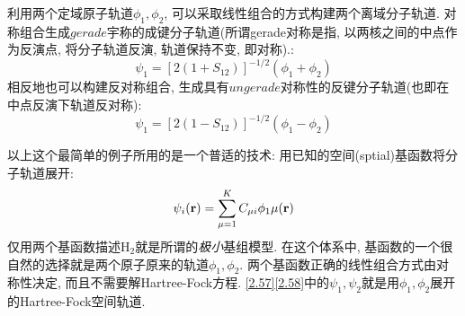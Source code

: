 利用两个定域原子轨道$\phi_1,\phi_2$, 可以采取线性组合的方式构建两个离域分子轨道. 对称组合生成$gerade$宇称的成键分子轨道(所谓gerade对称是指, 以两核之间的中点作为反演点, 将分子轨道反演, 轨道保持不变, 即对称).:
\begin{equation}
\label{2.57}
\psi_1=[2(1+S_{12})]^{-1/2}(\phi_1+\phi_2)
\end{equation}
相反地也可以构建反对称组合, 生成具有$ungerade$对称性的反键分子轨道(也即在中点反演下轨道反对称):
\begin{equation}
\label{2.58}
\psi_1=[2(1-S_{12})]^{-1/2}(\phi_1-\phi_2)
\end{equation}

以上这个最简单的例子所用的是一个普适的技术: 用已知的空间(sptial)基函数将分子轨道展开: 
\begin{equation}
\label{2.59}
\psi_i(\mathbf{r})=\sum_{\mu=1}^{K}C_{\mu i}\phi_1\mu(\mathbf{r})
\end{equation} 仅用两个基函数描述H$_2$就是所谓的\emph{极小}基组模型. 在这个体系中, 基函数的一个很自然的选择就是两个原子原来的轨道$\phi_1,\phi_2$. 两个基函数正确的线性组合方式由对称性决定, 而且不需要解Hartree-Fock方程. \ref{2.57}\ref{2.58}中的$\psi_1,\psi_2$就是用$\phi_1,\phi_2$展开的Hartree-Fock空间轨道.

